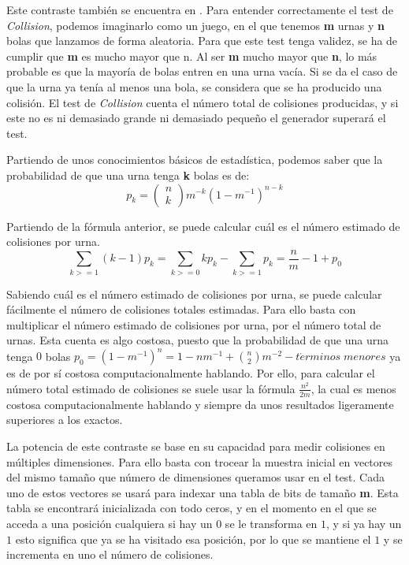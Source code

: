 \documentclass{article}
\begin{document}
Este contraste también se encuentra en \citet{knuth2014art}. Para entender correctamente el test de \emph{Collision}, podemos imaginarlo como un juego, en el que tenemos \textbf{m} urnas y \textbf{n} bolas que lanzamos de forma aleatoria. Para que este test tenga validez, se ha de cumplir que \textbf{m} es mucho mayor que n. Al ser \textbf{m} mucho mayor que \textbf{n}, lo más probable es que la mayoría de bolas entren en una urna vacía. Si se da el caso de que la urna ya tenía al menos una bola, se considera que se ha producido una colisión. El test de \emph{Collision} cuenta el número total de colisiones producidas, y si este no es ni demasiado grande ni demasiado pequeño el generador superará el test. 

Partiendo de unos conocimientos básicos de estadística, podemos saber que la probabilidad de que una urna tenga \textbf{k} bolas es de:
\begin{equation*}
    p_k = 
    \begin{pmatrix}
        n\\
        k
    \end{pmatrix}
    m^{-k}(1-m^{-1})^{n-k}
\end{equation*}

Partiendo de la fórmula anterior, se puede calcular cuál es el número estimado de colisiones por urna.
\begin{equation*}
    \sum_{k>=1}(k-1)p_k = \sum_{k>=0}kp_k-\sum_{k>=1}p_k = \frac{n}{m}-1+p_0 
\end{equation*}

Sabiendo cuál es el número estimado de colisiones por urna, se puede calcular fácilmente el número de colisiones totales estimadas. Para ello basta con multiplicar el número estimado de colisiones por urna, por el número total de urnas. Esta cuenta es algo costosa, puesto que la probabilidad de que una urna tenga $0$ bolas $p_0 = (1-m^{-1})^n = 1-nm^{-1}+\binom{n}{2}m^{-2}-t\acute{e}rminos\;menores$ ya es de por sí costosa computacionalmente hablando. Por ello, para calcular el número total estimado de colisiones se suele usar la fórmula $\frac{n^2}{2m}$, la cual es menos costosa computacionalmente hablando y siempre da unos resultados ligeramente superiores a los exactos.

La potencia de este contraste se base en su capacidad para medir colisiones en múltiples dimensiones. Para ello basta con trocear la muestra inicial en vectores del mismo tamaño que número de dimensiones queramos usar en el test. Cada uno de estos vectores se usará para indexar una tabla de bits de  tamaño \textbf{m}. Esta tabla se encontrará inicializada con todo ceros, y en el momento en el que se acceda a una posición cualquiera si hay un $0$ se le transforma en $1$, y si ya hay un $1$ esto significa que ya se ha visitado esa posición, por lo que se mantiene el $1$ y se incrementa en uno el número de colisiones.
\end{document}
